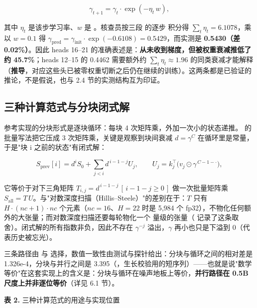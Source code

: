 \documentclass[11pt,openany]{ctexart}
\begin{document}
\[
\gamma_{t+1}=\gamma_t\cdot\exp(-\eta_t\,w),
\]

其中 $\eta_t$ 是该步学习率、$w$ 是 。核查员按三段  的逐步  积分得 $\sum_t\eta_t=6.1078$，乘以 $w=0.1$ 得 $\gamma_{\text{pred}}=\gamma_{\text{init}}\cdot\exp(-0.6108)=0.5429$，而实测是 \textbf{0.5430（差 0.02\allowbreak{}\%）}。因此 heads 16–21 的准确表述是：\textbf{从未收到梯度，但被权重衰减推低了约 45.7\allowbreak{}\%}；heads 12–15 的 0.4462 需要额外约 $\sum_t\eta_t\approx1.96$ 的同类衰减才能解释（\textbf{推导}，对应这些头已被零权重切断之后仍在继续的训练）。这两条都是已验证的推论，不是假说，也与 2.4 节的实测结构互为印证。

\subsection{三种计算范式与分块闭式解}

参考实现的分块形式是逐块循环：每块 4 次矩阵乘，外加一次小的状态递推。 的批量写法把它压成 3 次矩阵乘，关键是观察到块间衰减 $d=\gamma^{C}$ 在循环里是常量，于是"块 i 之前的状态"有闭式解：

\[
S_{\text{prev}}[i]=d^{i}S_0+\sum_{j<i}d^{\,i-1-j}U_j,\qquad U_j=k_j^{\top}\big(v_j\odot\gamma^{\,C-1-\cdot}\big),
\]

它等价于对下三角矩阵 $T_{i,j}=d^{\,i-1-j}\,[\,i-1-j\ge0\,]$ 做一次批量矩阵乘 $S_{\text{all}}=T\,U$。与"对数深度扫描（Hillis–Steele）"的差别在于：$T$ 只有 $H\cdot(nc+1)\cdot nc$ 个元素（$nc=16$、$H=22$ 时是 5,984 个 fp32），不物化任何额外的大张量；而对数深度扫描还要每轮物化一个 \code{[B,H,nc,kd,vd]} 量级的张量（ 记录了这条取舍）。闭式解的所有指数非负，因此不存在 $\gamma^{-j}$ 溢出，$\gamma$ 再小也只是下溢到 0（代表历史被忘光）。

三条路径由  与  选择，数值一致性由测试与探针给出：分块与循环之间的相对差是 1.326e-4，分块与并行之间是 3.395（，生长校验用的短序列）——也就是说"数学等价"在这套实现上的含义是：分块与循环在噪声地板上等价，\textbf{并行路径在 0.5B 尺度上并非逐位等价}（详见 6.1 节）。

\noindent\textbf{表 2.} 三种计算范式的用途与实现位置
\end{document}
